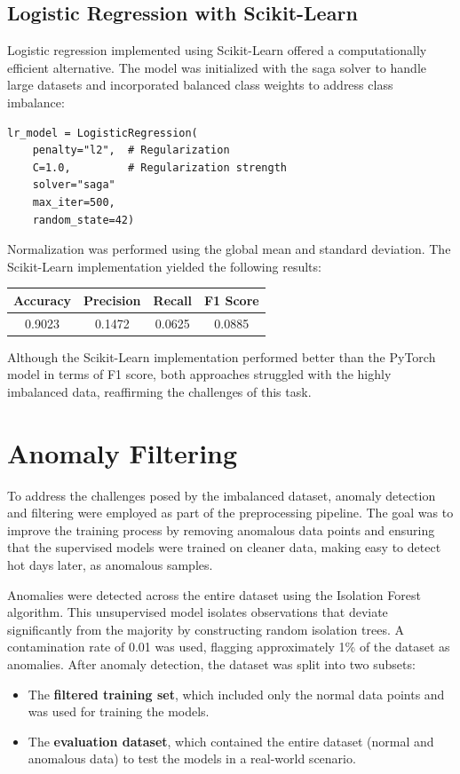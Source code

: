 \documentclass[conference,9pt]{IEEEtran}
\begin{document}
\subsection{Logistic Regression with Scikit-Learn}
Logistic regression implemented using Scikit-Learn offered a computationally efficient alternative. The model was initialized with the saga solver to handle large datasets and incorporated balanced class weights to address class imbalance:

\begin{lstlisting}
lr_model = LogisticRegression(
    penalty="l2",  # Regularization
    C=1.0,         # Regularization strength
    solver="saga"
    max_iter=500,
    random_state=42)
\end{lstlisting}
Normalization was performed using the global mean and standard deviation. The Scikit-Learn implementation yielded the following results:
\begin{center}
    \begin{tabular}{c|c|c|c}
        Accuracy & Precision & Recall & F1 Score \\ 
        \hline 
        0.9023 & 0.1472 &  0.0625 & 0.0885\\
    \end{tabular}
\end{center}
Although the Scikit-Learn implementation performed better than the PyTorch model in terms of F1 score, both approaches struggled with the highly imbalanced data, reaffirming the challenges of this task.

\section{Anomaly Filtering}
To address the challenges posed by the imbalanced dataset, anomaly detection and filtering were employed as part of the preprocessing pipeline. The goal was to improve the training process by removing anomalous data points and ensuring that the supervised models were trained on cleaner data, making easy to detect hot days later, as anomalous samples.

Anomalies were detected across the entire dataset using the Isolation Forest algorithm. This unsupervised model isolates observations that deviate significantly from the majority by constructing random isolation trees. A contamination rate of 0.01 was used, flagging approximately 1\% of the dataset as anomalies. After anomaly detection, the dataset was split into two subsets:
\begin{itemize}
    \item The \textbf{filtered training set}, which included only the normal data points and was used for training the models.
    \item The \textbf{evaluation dataset}, which contained the entire dataset (normal and anomalous data) to test the models in a real-world scenario.
\end{itemize}
\end{document}
